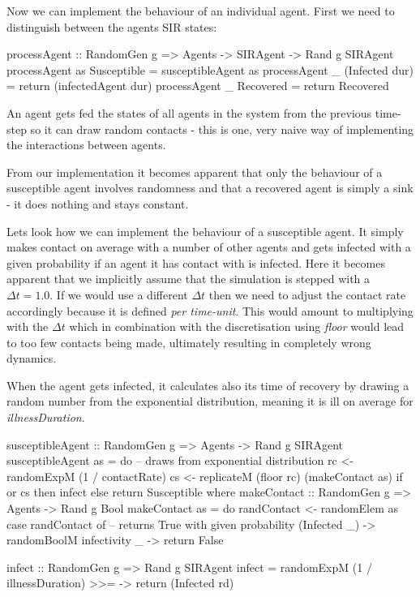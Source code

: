 Now we can implement the behaviour of an individual agent. First we need to distinguish between the agents SIR states:

\begin{HaskellCode}
processAgent :: RandomGen g 
  => Agents -> SIRAgent -> Rand g SIRAgent
processAgent as Susceptible    = susceptibleAgent as
processAgent _  (Infected dur) = return (infectedAgent dur)
processAgent _  Recovered      = return Recovered
\end{HaskellCode}

An agent gets fed the states of all agents in the system from the previous time-step so it can draw random contacts - this is one, very naive way of implementing the interactions between agents.

From our implementation it becomes apparent that only the behaviour of a susceptible agent involves randomness and that a recovered agent is simply a sink - it does nothing and stays constant.

Lets look how we can implement the behaviour of a susceptible agent. It simply makes contact on average with a number of other agents and gets infected with a given probability if an agent it has contact with is infected. Here it becomes apparent that we implicitly assume that the simulation is stepped with a $\Delta t = 1.0$. If we would use a different $\Delta t$ then we need to adjust the contact rate accordingly because it is defined \textit{per time-unit}. This would amount to multiplying with the $\Delta t$ which in combination with the discretisation using \textit{floor} would lead to too few contacts being made, ultimately resulting in completely wrong dynamics.

When the agent gets infected, it calculates also its time of recovery by drawing a random number from the exponential distribution, meaning it is ill on average for \textit{illnessDuration}.

\begin{HaskellCode}
susceptibleAgent :: RandomGen g => Agents -> Rand g SIRAgent
susceptibleAgent as = do
    -- draws from exponential distribution
    rc <- randomExpM (1 / contactRate) 
    cs <- replicateM (floor rc) (makeContact as)
    if or cs
      then infect
      else return Susceptible
  where
    makeContact :: RandomGen g => Agents -> Rand g Bool
    makeContact as = do
      randContact <- randomElem as
      case randContact of
        -- returns True with given probability 
        (Infected _) -> randomBoolM infectivity 
        _            -> return False

    infect :: RandomGen g => Rand g SIRAgent
    infect = randomExpM (1 / illnessDuration) 
               >>= \rd -> return (Infected rd)
\end{HaskellCode}

